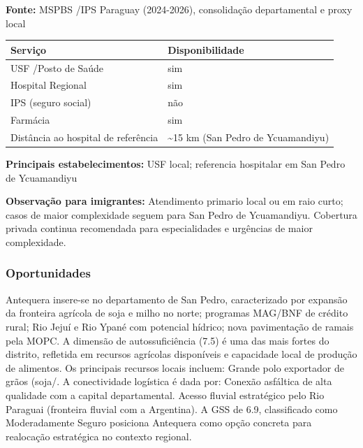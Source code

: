 \textbf{Fonte:} MSPBS /\allowbreak  IPS Paraguay (2024-2026), consolidação
departamental e proxy local

{\def\LTcaptype{none} %
\begin{longtable}[]{@{}
  >{\raggedright\arraybackslash}p{}
  >{\raggedright\arraybackslash}p{}@{}}
\toprule\noalign{}
\begin{minipage}[b]{\linewidth}\raggedright
Serviço
\end{minipage} & \begin{minipage}[b]{\linewidth}\raggedright
Disponibilidade
\end{minipage} \\
\midrule\noalign{}
\endhead
\bottomrule\noalign{}
\endlastfoot
USF /\allowbreak  Posto de Saúde & sim \\
Hospital Regional & sim \\
IPS (seguro social) & não \\
Farmácia & sim \\
Distância ao hospital de referência & \textasciitilde15 km (San Pedro de
Ycuamandiyu) \\
\end{longtable}
}

\textbf{Principais estabelecimentos:} USF local; referencia hospitalar
em San Pedro de Ycuamandiyu

\textbf{Observação para imigrantes:} Atendimento primario local ou em
raio curto; casos de maior complexidade seguem para San Pedro de
Ycuamandiyu. Cobertura privada continua recomendada para especialidades
e urgências de maior complexidade.
\newpage

\subsubsection*{Oportunidades}\label{oport-antequera-0202}
Antequera insere-se no departamento de San Pedro, caracterizado por expansão da fronteira agrícola de soja e milho no norte; programas MAG/BNF de crédito rural; Rio Jejuí e Rio Ypané com potencial hídrico; nova pavimentação de ramais pela MOPC. A dimensão de autossuficiência (7.5) é uma das mais fortes do distrito, refletida em recursos agrícolas disponíveis e capacidade local de produção de alimentos. Os principais recursos locais incluem: Grande polo exportador de grãos (soja/. A conectividade logística é dada por: Conexão asfáltica de alta qualidade com a capital departamental. Acesso fluvial estratégico pelo Rio Paraguai (fronteira fluvial com a Argentina). A GSS de 6.9, classificado como Moderadamente Seguro posiciona Antequera como opção concreta para realocação estratégica no contexto regional.

